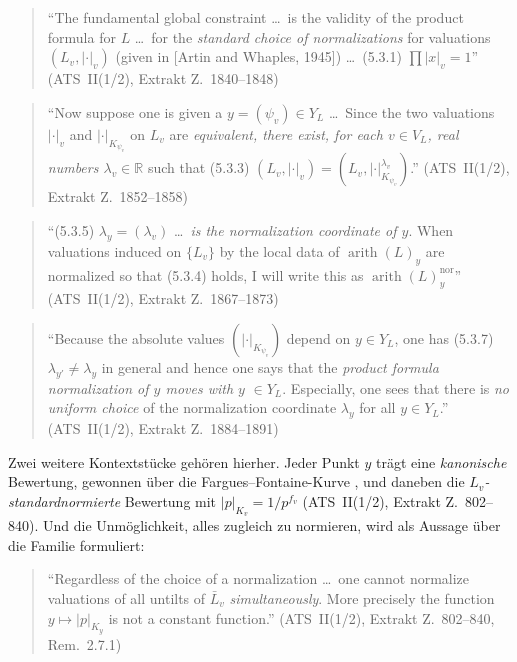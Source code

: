 \documentclass[11pt,a4paper]{article}
\theoremstyle{definition}
\theoremstyle{plain}
\theoremstyle{definition}
\newcommand{\arith}{\operatorname{arith}}
\newcommand{\Ynum}{Y_L}
\newcommand{\anchor}[2]{(#1, Extrakt Z.~#2)}
\begin{document}
\begin{quote}\small
``The fundamental global constraint \ldots\ is the validity of the product formula
for $L$ \ldots\ for the \emph{standard choice of normalizations} for valuations
$(L_v, |\cdot|_v)$ (given in [Artin and Whaples, 1945]) \ldots\ (5.3.1)
$\prod |x|_v = 1$'' \hfill\anchor{ATS~II(1/2)}{1840--1848}
\end{quote}

\begin{quote}\small
``Now suppose one is given a $y = (\psi_v) \in \Ynum$ \ldots\ Since the two
valuations $|\cdot|_v$ and $|\cdot|_{K_{\psi_v}}$ on $L_v$ are \emph{equivalent,
there exist, for each $v \in V_L$, real numbers $\lambda_v \in \mathbb{R}$} such
that (5.3.3) $(L_v, |\cdot|_v) = (L_v, |\cdot|^{\lambda_v}_{K_{\psi_v}})$.''
\hfill\anchor{ATS~II(1/2)}{1852--1858}
\end{quote}

\begin{quote}\small
``(5.3.5) $\lambda_y = (\lambda_v)$ \ldots\ \emph{is the normalization coordinate
of $y$}. When valuations induced on $\{L_v\}$ by the local data of $\arith(L)_y$
are normalized so that (5.3.4) holds, I will write this as
$\arith(L)^{\mathrm{nor}}_y$'' \hfill\anchor{ATS~II(1/2)}{1867--1873}
\end{quote}

\begin{quote}\small
``Because the absolute values $(|\cdot|_{K_{\psi_v}})$ depend on $y \in \Ynum$,
one has (5.3.7) $\lambda_{y'} \neq \lambda_y$ in general and hence one says that
the \emph{product formula normalization of $y$ moves with $y$} $\in \Ynum$.
Especially, one sees that there is \emph{no uniform choice} of the normalization
coordinate $\lambda_y$ for all $y \in \Ynum$.''
\hfill\anchor{ATS~II(1/2)}{1884--1891}
\end{quote}

Zwei weitere Kontextstücke gehören hierher. Jeder Punkt $y$ trägt eine
\emph{kanonische} Bewertung, gewonnen über die Fargues--Fontaine-Kurve
\cite{FarguesFontaine2018}, und daneben die \emph{$L_v$-standardnormierte} Bewertung
mit $|p|_{K_v} = 1/p^{f_v}$ \anchor{ATS~II(1/2)}{802--840}. Und die Unmöglichkeit,
alles zugleich zu normieren, wird als Aussage über die Familie formuliert:

\begin{quote}\small
``Regardless of the choice of a normalization \ldots\ one cannot normalize
valuations of all untilts of $\bar{L}_v$ \emph{simultaneously}. More precisely the
function $y \mapsto |p|_{K_y}$ is not a constant function.''
\hfill\anchor{ATS~II(1/2)}{802--840, Rem.~2.7.1}
\end{quote}
\end{document}
